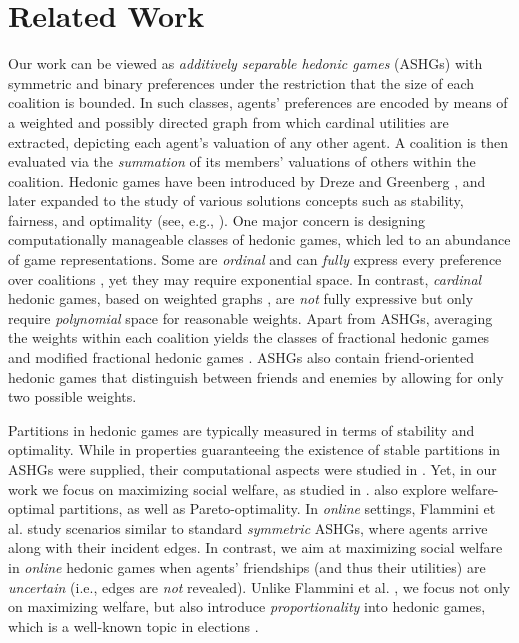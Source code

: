 \documentclass[letterpaper]{article}
\begin{document}
\section{Related Work}
Our work can be viewed as \textit{additively separable hedonic games} (ASHGs) \cite{bogomolnaia2002stability} with symmetric and binary preferences under the restriction that the size of each coalition is bounded. In such classes, agents' preferences are encoded by means of a weighted and possibly directed graph from which cardinal utilities are extracted, depicting each agent's valuation of any other agent. A coalition is then evaluated via the \textit{summation} of its members' valuations of others within the coalition. Hedonic games have been introduced by Dreze and Greenberg , and later expanded to the study of various solutions concepts such as stability, fairness, and optimality (see, e.g., \cite{aziz_savani_moulin_2016,woeginger2013core}). One major concern is designing computationally manageable classes of hedonic games, which led to an abundance of game representations. Some are \textit{ordinal} and can \textit{fully} express every preference over coalitions \cite{bouveret2010fair,elkind2009hedonic}, yet they may require exponential space. In contrast, \textit{cardinal} hedonic games, based on weighted graphs \cite{aziz2019fractional,bogomolnaia2002stability}, are \textit{not} fully expressive but only require \textit{polynomial} space for reasonable weights. Apart from ASHGs, averaging the weights within each coalition yields the classes of fractional hedonic games \cite{aziz2019fractional} and modified fractional hedonic games \cite{olsen2012defining}. ASHGs also contain friend-oriented hedonic games \cite{dimitrov2006simple} that distinguish between friends and enemies by allowing for only two possible weights. %

Partitions in hedonic games are typically measured in terms of stability and optimality. While in \cite{banerjee2001core,bogomolnaia2002stability} properties guaranteeing the existence of stable partitions in ASHGs were supplied, their computational aspects were studied in \cite{aziz2011stable,ballester2004np}. Yet, in our work we focus on maximizing social welfare, as studied in \cite{aziz2015welfare,monaco2020stable}. \cite{bullinger2020pareto,elkind2020price} also explore welfare-optimal partitions, as well as Pareto-optimality. In \textit{online} settings, Flammini et al.  study scenarios similar to standard \textit{symmetric} ASHGs, where agents arrive along with their incident edges. In contrast, we aim at maximizing social welfare in \textit{online} hedonic games when agents' friendships (and thus their utilities) are \textit{uncertain} (i.e., edges are \textit{not} revealed). Unlike Flammini et al. , we focus not only on maximizing welfare, but also introduce \textit{proportionality} into hedonic games, which is a well-known topic in elections \cite{lackner2023approval}. %
\end{document}

